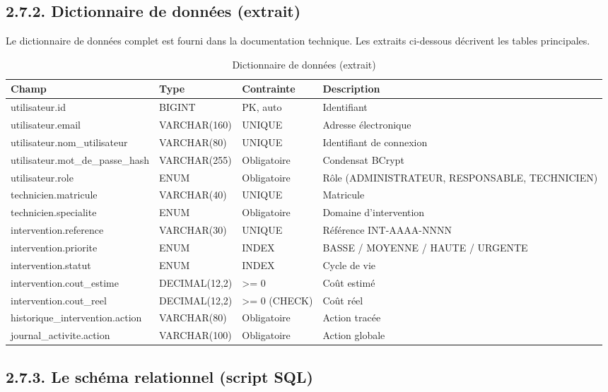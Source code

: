 \documentclass[11pt,a4paper]{report}
\begin{document}
\subsection*{2.7.2. Dictionnaire de données (extrait)}

Le dictionnaire de données complet est fourni dans la documentation technique. Les extraits ci-dessous décrivent les tables principales.
\begin{table}[htbp]\centering\small
\begin{tabularx}{\textwidth}{|X|X|X|X|}
\hline\rowcolor{hdr}\textbf{Champ} & \textbf{Type} & \textbf{Contrainte} & \textbf{Description}\\ \hline
utilisateur.id & BIGINT & PK, auto & Identifiant\\ \hline
utilisateur.email & VARCHAR(160) & UNIQUE & Adresse électronique\\ \hline
utilisateur.nom\_utilisateur & VARCHAR(80) & UNIQUE & Identifiant de connexion\\ \hline
utilisateur.mot\_de\_passe\_hash & VARCHAR(255) & Obligatoire & Condensat BCrypt\\ \hline
utilisateur.role & ENUM & Obligatoire & Rôle (ADMINISTRATEUR, RESPONSABLE, TECHNICIEN)\\ \hline
technicien.matricule & VARCHAR(40) & UNIQUE & Matricule\\ \hline
technicien.specialite & ENUM & Obligatoire & Domaine d'intervention\\ \hline
intervention.reference & VARCHAR(30) & UNIQUE & Référence INT-AAAA-NNNN\\ \hline
intervention.priorite & ENUM & INDEX & BASSE / MOYENNE / HAUTE / URGENTE\\ \hline
intervention.statut & ENUM & INDEX & Cycle de vie\\ \hline
intervention.cout\_estime & DECIMAL(12,2) & >= 0 & Coût estimé\\ \hline
intervention.cout\_reel & DECIMAL(12,2) & >= 0 (CHECK) & Coût réel\\ \hline
historique\_intervention.action & VARCHAR(80) & Obligatoire & Action tracée\\ \hline
journal\_activite.action & VARCHAR(100) & Obligatoire & Action globale\\ \hline
\end{tabularx}
\caption{Dictionnaire de données (extrait)}
\end{table}
\subsection*{2.7.3. Le schéma relationnel (script SQL)}
\end{document}
